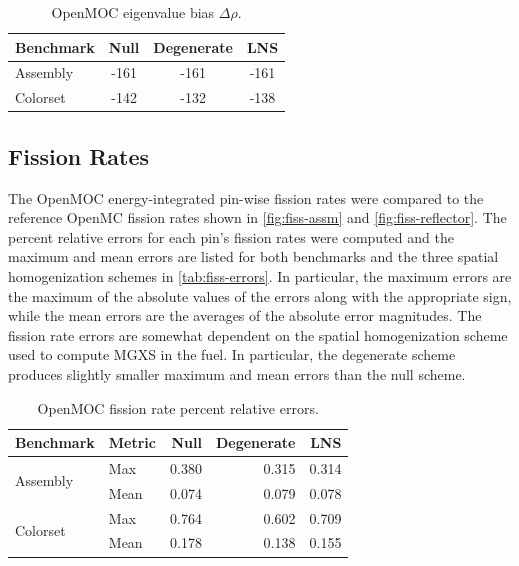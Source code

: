 \begin{table}[h!]
  \centering
  \caption{OpenMOC eigenvalue bias $\Delta\rho$.}
  \label{tab:keff-bias}
  \begin{tabular}{l c c c}
  \toprule
  \textbf{Benchmark} & \textbf{Null} & \textbf{Degenerate} & \textbf{LNS} \\
  \midrule
  Assembly & -161 & -161 & -161 \\
  Colorset & -142 & -132 & -138 \\
  \bottomrule
\end{tabular}
\end{table}


\subsection{Fission Rates}
\label{subsec:fiss-rates}

The OpenMOC energy-integrated pin-wise fission rates were compared to the reference OpenMC fission rates shown in \autoref{fig:fiss-assm} and \autoref{fig:fiss-reflector}. The percent relative errors for each pin's fission rates were computed and the maximum and mean errors are listed for both benchmarks and the three spatial homogenization schemes in \autoref{tab:fiss-errors}. In particular, the maximum errors are the maximum of the absolute values of the errors along with the appropriate sign, while the mean errors are the averages of the absolute error magnitudes. The fission rate errors are somewhat dependent on the spatial homogenization scheme used to compute MGXS in the fuel. In particular, the degenerate scheme produces slightly smaller maximum and mean errors than the null scheme.

\begin{table}[h!]
  \centering
  \caption{OpenMOC fission rate percent relative errors.}
  \label{tab:fiss-errors}
  \begin{tabular}{l l r r r}
  \toprule
  \textbf{Benchmark} & \textbf{Metric} & \textbf{Null} & \textbf{Degenerate} & \textbf{LNS} \\
  \midrule
  \multirow{2}{*}{Assembly} & Max  & 0.380 & 0.315 & 0.314 \\
                            & Mean & 0.074 & 0.079 & 0.078 \\
  \midrule
  \multirow{2}{*}{Colorset} & Max  & 0.764 & 0.602 & 0.709 \\
                            & Mean & 0.178 & 0.138 & 0.155 \\
  \bottomrule
\end{tabular}
\end{table}

